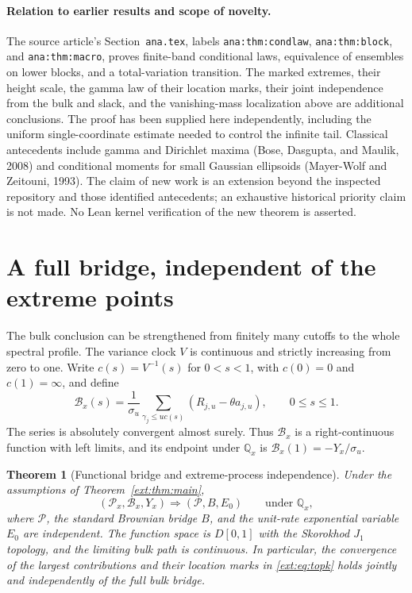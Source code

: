\documentclass[11pt]{article}
\newtheorem{theorem}{Theorem}[section]
\theoremstyle{definition}
\theoremstyle{remark}
\begin{document}
\paragraph{Relation to earlier results and scope of novelty.}
The source article's Section~\texttt{ana.tex}, labels
\texttt{ana:thm:condlaw}, \texttt{ana:thm:block}, and
\texttt{ana:thm:macro}, proves finite-band conditional laws, equivalence
of ensembles on lower blocks, and a total-variation transition.
The marked extremes, their height scale, the gamma law of their location
marks, their joint independence from the bulk and slack, and the
vanishing-mass localization above are additional conclusions.
The proof has been supplied here independently, including the uniform
single-coordinate estimate needed to control the infinite tail.
Classical antecedents include gamma and Dirichlet maxima
(Bose, Dasgupta, and Maulik, 2008) and conditional moments for small
Gaussian ellipsoids (Mayer-Wolf and Zeitouni, 1993).  The claim of new
work is an extension beyond the inspected repository and those
identified antecedents; an exhaustive historical priority claim is not
made.  No Lean kernel verification of the new theorem is asserted.


\section{A full bridge, independent of the extreme points}
\label{ext:sec:functional}

The bulk conclusion can be strengthened from finitely many cutoffs to the
whole spectral profile.  The variance clock $V$ is continuous and strictly
increasing from zero to one.  Write $c(s)=V^{-1}(s)$ for $0<s<1$, with
$c(0)=0$ and $c(1)=\infty$, and define
\begin{equation}\label{ext:eq:bulkprocess}
 \mathcal B_x(s)=\frac1{\sigma_u}
   \sum_{\gamma_j\le u c(s)}(R_{j,u}-\theta a_{j,u}),
       \qquad 0\le s\le1.
\end{equation}
The series is absolutely convergent almost surely.  Thus
$\mathcal B_x$ is a right-continuous function with left limits, and its
endpoint under $\mathbb Q_x$ is
$\mathcal B_x(1)=-Y_x/\sigma_u$.

\begin{theorem}[Functional bridge and extreme-process independence]
\label{ext:thm:functional}
Under the assumptions of Theorem~\ref{ext:thm:main},
\[
 (\mathcal P_x,\mathcal B_x,Y_x)
       \Longrightarrow (\mathcal P,B,E_0)
       \qquad\text{under }\mathbb Q_x,
\]
where $\mathcal P$, the standard Brownian bridge $B$, and the unit-rate
exponential variable $E_0$ are independent.  The function space is
$D[0,1]$ with the Skorokhod $J_1$ topology, and the limiting bulk path is
continuous.  In particular, the convergence of the largest contributions
and their location marks in \eqref{ext:eq:topk} holds jointly and
independently of the full bulk bridge.
\end{theorem}
\end{document}
